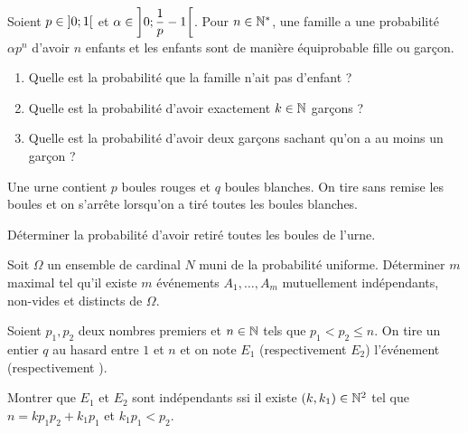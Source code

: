 \begin{exo}~\\
Soient \(p\in\left]0;1\right[\) et \(\alpha\in\left]0;\dfrac{1}{p}-1\right[\). Pour \(n\in\mathbb{N}^*\), une famille a une probabilité \(\alpha p^n\) d'avoir \(n\) enfants et les enfants sont de manière équiprobable fille ou garçon.

\begin{enumerate}
    \item Quelle est la probabilité que la famille n'ait pas d'enfant ? \\
    \item Quelle est la probabilité d'avoir exactement \(k\in\mathbb{N}\) garçons ? \\
    \item Quelle est la probabilité d'avoir deux garçons sachant qu'on a au moins un garçon ?
\end{enumerate}
\end{exo}

\begin{exo}
Une urne contient \(p\) boules rouges et \(q\) boules blanches. On tire sans remise les boules et on s'arrête lorsqu'on a tiré toutes les boules blanches.

Déterminer la probabilité d'avoir retiré toutes les boules de l'urne.
\end{exo}

\begin{exo}
Soit \(\Omega\) un ensemble de cardinal \(N\) muni de la probabilité uniforme. Déterminer \(m\) maximal tel qu'il existe \(m\) événements \(A_1,\dots,A_m\) mutuellement indépendants, non-vides et distincts de \(\Omega\).
\end{exo}

\begin{exo}[Oral X, 8]
Soient \(p_1,p_2\) deux nombres premiers et \(n\in\mathbb{N}\) tels que \(p_1<p_2\leq n\). On tire un entier \(q\) au hasard entre \(1\) et \(n\) et on note \(E_1\) (respectivement \(E_2\)) l'événement  (respectivement ).

Montrer que \(E_1\) et \(E_2\) sont indépendants ssi il existe \(\left(k,k_1\right)\in\mathbb{N}^2\) tel que \(n=kp_1p_2+k_1p_1\) et \(k_1p_1<p_2\).
\end{exo}
